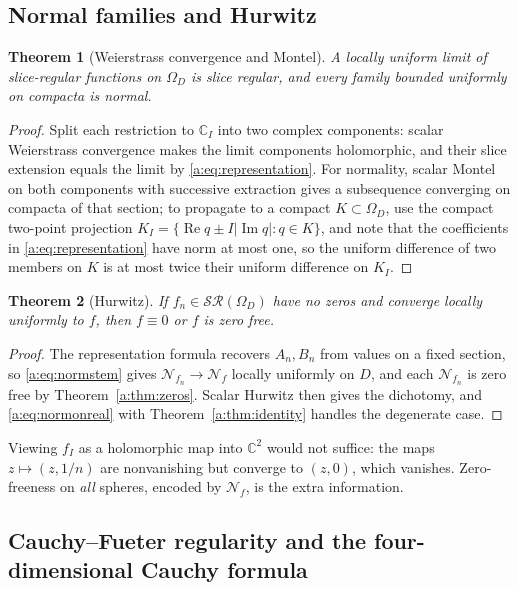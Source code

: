 \documentclass[11pt,a4paper]{article}
\numberwithin{equation}{section}
\newtheorem{theorem}{Theorem}[section]
\theoremstyle{definition}
\theoremstyle{remark}
\theoremstyle{plain}
\newcommand{\CC}{\mathbb C}
\DeclareMathOperator{\Rea}{Re}
\DeclareMathOperator{\Ima}{Im}
\newcommand{\SR}{\mathcal{SR}}
\newcommand{\Om}{\Omega}
\newcommand{\abs}[1]{\lvert #1\rvert}
\begin{document}
\subsection{Normal families and Hurwitz}
\label{a:sec:normal}

\begin{theorem}[Weierstrass convergence and Montel]
\label{a:thm:montel}
A locally uniform limit of slice-regular functions on $\Om_D$ is slice
regular, and every family bounded uniformly on compacta is normal.
\end{theorem}

\begin{proof}
Split each restriction to $\CC_I$ into two complex components: scalar
Weierstrass convergence makes the limit components holomorphic, and their
slice extension equals the limit by \eqref{a:eq:representation}. For
normality, scalar Montel on both components with successive extraction gives
a subsequence converging on compacta of that section; to propagate to a
compact $K\subset\Om_D$, use the compact two-point projection
$K_I=\{\Rea q\pm I\abs{\Ima q}:q\in K\}$, and note that the coefficients in
\eqref{a:eq:representation} have norm at most one, so the uniform difference
of two members on $K$ is at most twice their uniform difference on $K_I$.
\end{proof}

\begin{theorem}[Hurwitz]
\label{a:thm:hurwitz}
If $f_n\in\SR(\Om_D)$ have no zeros and converge locally uniformly to $f$,
then $f\equiv0$ or $f$ is zero free.
\end{theorem}

\begin{proof}
The representation formula recovers $A_n,B_n$ from values on a fixed section,
so \eqref{a:eq:normstem} gives $\mathcal N_{f_n}\to\mathcal N_f$ locally
uniformly on $D$, and each $\mathcal N_{f_n}$ is zero free by
Theorem~\ref{a:thm:zeros}. Scalar Hurwitz then gives the dichotomy, and
\eqref{a:eq:normonreal} with Theorem~\ref{a:thm:identity} handles the
degenerate case.
\end{proof}

Viewing $f_I$ as a holomorphic map into $\CC^2$ would not suffice: the maps
$z\mapsto(z,1/n)$ are nonvanishing but converge to $(z,0)$, which vanishes.
Zero-freeness on \emph{all} spheres, encoded by $\mathcal N_f$, is the extra
information.

\subsection{Cauchy--Fueter regularity and the four-dimensional Cauchy formula}
\label{a:sec:fueter-cauchy}
\end{document}
